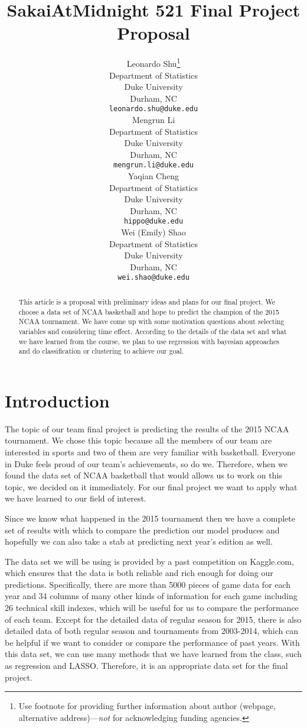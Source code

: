 \documentclass{article} %
\title{SakaiAtMidnight 521 Final Project Proposal}
\author{
Leonardo Shu\thanks{ Use footnote for providing further information
about author (webpage, alternative address)---\emph{not} for acknowledging
funding agencies.} \\
Department of Statistics\\
Duke University\\
Durham, NC \\
\texttt{leonardo.shu@duke.edu} \\
\And
Mengrun Li \\
Department of Statistics\\
Duke University\\
Durham, NC \\
\texttt{mengrun.li@duke.edu} \\
\AND
Yaqian Cheng \\
Department of Statistics\\
Duke University\\
Durham, NC \\
\texttt{hippo@duke.edu} \\
\And
Wei (Emily) Shao \\
Department of Statistics\\
Duke University\\
Durham, NC \\
\texttt{wei.shao@duke.edu} \\
}
\begin{document}
\maketitle

\begin{abstract}
This article is a proposal with preliminary ideas and plans for our final project. We choose a data set of NCAA basketball and hope to predict the champion of the 2015 NCAA tournament. We have come up with some motivation questions about selecting variables and considering time effect. According to the details of the data set and what we have learned from the course, we plan to use regression with bayesian approaches and do classification or clustering to achieve our goal.
\end{abstract}

\section{Introduction}

The topic of our team final project is predicting the results of the 2015 NCAA tournament. We chose this topic because all the members of our team are interested in sports and two of them are very familiar with basketball. Everyone in Duke feels proud of our team's achievements, so do we. Therefore, when we found the data set of NCAA basketball that would allows us to work on this topic, we decided on it immediately. For our final project we want to apply what we have learned to our field of interest.

Since we know what happened in the 2015 tournament then we have a complete set of results with which to compare the prediction our model produces and hopefully we can also take a stab at predicting next year's edition as well.

The data set we will be using is provided by a past competition on Kaggle.com, which ensures that the data is both reliable and rich enough for doing our predictions. Specifically, there are more than 5000 pieces of game data for each year and 34 columns of many other kinds of information for each game including 26 technical skill indexes, which will be useful for us to compare the performance of each team. Except for the detailed data of regular season for 2015, there is also detailed data of both regular season and tournaments from 2003-2014, which can be helpful if we want to consider or compare the performance of past years. With this data set, we can use many methods that we have learned from the class, such as regression and LASSO. Therefore, it is an appropriate data set for the final project.
\end{document}
